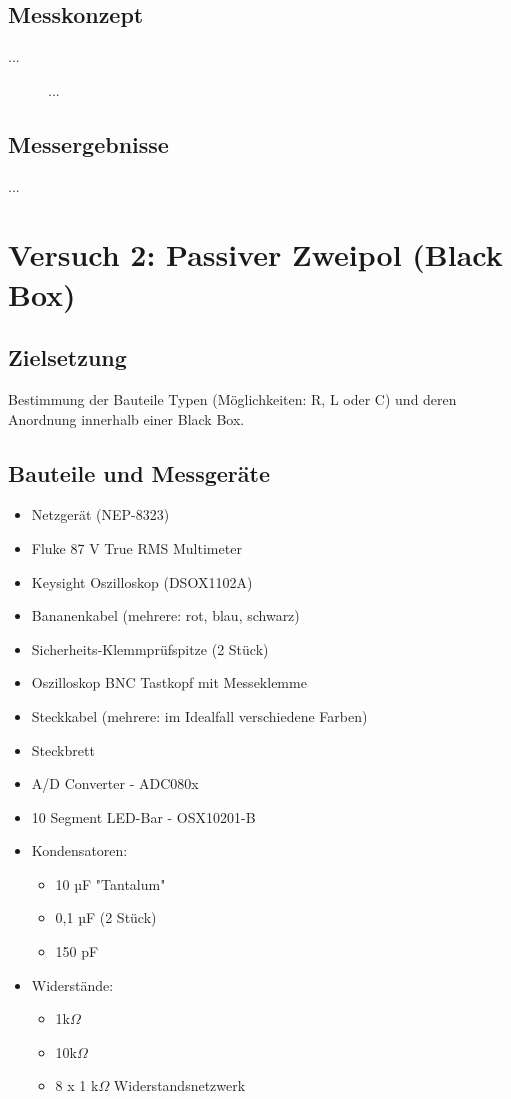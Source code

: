 \documentclass[a4paper,12pt]{article}
\begin{document}
\subsection{Messkonzept}
...

\begin{figure}[H]
    \centering
\caption{...}
\end{figure}


\subsection{Messergebnisse}
...



\section{Versuch 2: Passiver Zweipol (Black Box)}
\subsection{Zielsetzung}
Bestimmung der Bauteile Typen (Möglichkeiten: R, L oder C) und deren Anordnung innerhalb einer
Black Box.

\subsection{Bauteile und Messgeräte}
\begin{itemize}
\item Netzgerät (NEP-8323)
\item Fluke 87 V True RMS Multimeter
\item Keysight Oszilloskop (DSOX1102A)
\item Bananenkabel (mehrere: rot, blau, schwarz)
\item Sicherheits-Klemmprüfspitze (2 Stück)
\item Oszilloskop BNC Tastkopf mit Messeklemme
\item Steckkabel (mehrere: im Idealfall verschiedene Farben)
\item Steckbrett\\
\end{itemize}


\begin{itemize}
\item A/D Converter - ADC080x
\item 10 Segment LED-Bar - OSX10201-B
\newpage
\item Kondensatoren: 
	\begin{itemize}
	\item 10 µF "Tantalum"
	\item 0,1 µF (2 Stück)
	\item 150 pF
	\end{itemize}
\item Widerstände: 
	\begin{itemize}
	\item 1k$\Omega$
	\item 10k$\Omega$
	\item 8 x 1 k$\Omega$ Widerstandsnetzwerk
	\end{itemize}
\end{itemize}
\end{document}
